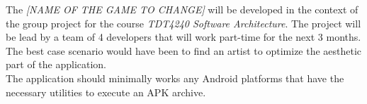 The \textit{[NAME OF THE GAME TO CHANGE]} will be developed in the context of the group project for the course \textit{TDT4240 Software Architecture}. The project will be lead by a team of 4 developers that will work part-time for the next 3 months. The best case scenario would have been to find an artist to optimize the aesthetic part of the application. \\

The application should minimally works any Android platforms that have the necessary utilities to execute an APK archive.
